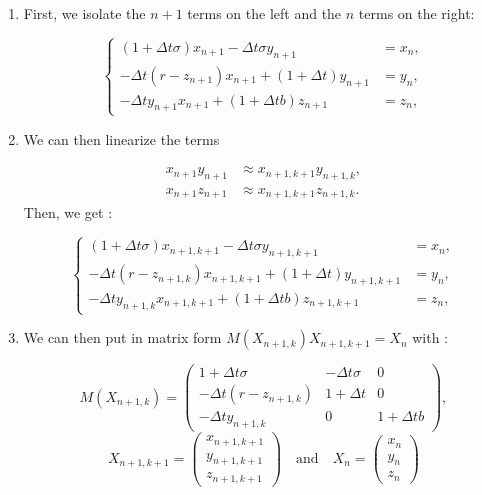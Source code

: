 \documentclass[12pt]{article}
\begin{document}
	\begin{enumerate}[label=\textbullet]
		\item First, we isolate the $n+1$ terms on the left and the $n$ terms on the right:
		
		$$\left\{\begin{aligned} 
			(1+\Delta t\sigma)x_{n+1}-\Delta t\sigma y_{n+1}&=x_n, \\
			-\Delta t(r-z_{n+1})x_{n+1}+(1+\Delta t)y_{n+1}&=y_n, \\
			-\Delta ty_{n+1}x_{n+1}+(1+\Delta tb)z_{n+1}&=z_n,
		\end{aligned}\right.$$
		
		\item We can then linearize the terms 
		
		$$\begin{aligned}
			x_{n+1}y_{n+1}&\approx x_{n+1,k+1}y_{n+1,k}, \\
			x_{n+1}z_{n+1}&\approx x_{n+1,k+1}z_{n+1,k}.
		\end{aligned}$$ 		
		\noindent Then, we get :
		
		$$\left\{\begin{aligned} 
			(1+\Delta t\sigma)x_{n+1,k+1}-\Delta t\sigma y_{n+1,k+1}&=x_n ,\\
			-\Delta t(r-z_{n+1,k})x_{n+1,k+1}+(1+\Delta t)y_{n+1,k+1}&=y_n , \\
			-\Delta ty_{n+1,k}x_{n+1,k+1}+(1+\Delta tb)z_{n+1,k+1}&=z_n ,
		\end{aligned}\right.$$
		
		\item We can then put in matrix form  $M(X_{n+1,k})X_{n+1,k+1}=X_n$ with :
		
		$$M(X_{n+1,k})=\begin{pmatrix}
			1+\Delta t\sigma & -\Delta t\sigma & 0 \\
			-\Delta t(r-z_{n+1,k}) & 1+\Delta t & 0 \\
			-\Delta ty_{n+1,k} & 0 & 1+\Delta tb
		\end{pmatrix},$$
		$$X_{n+1,k+1}=\begin{pmatrix}
			x_{n+1,k+1} \\
			y_{n+1,k+1} \\
			z_{n+1,k+1}
		\end{pmatrix} \quad \text{and} \quad X_n=\begin{pmatrix}
			x_n \\
			y_n \\
			z_n
		\end{pmatrix} $$
	\end{enumerate}
\end{document}
